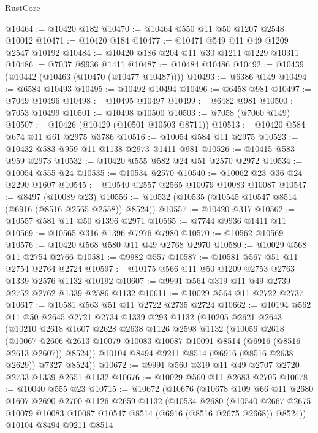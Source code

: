 \begin{lexlean}{RustCore}
\begin{coremodule}
@10464 := @10420 @182
@10470 := @10464 @550 @11 @50 @1207 @2548 @10012
@10471 := @10420 @184
@10477 := @10471 @549 @11 @49 @1209 @2547 @10192
@10484 := @10420 @186 @204 @11 @30 @1211 @1229 @10311
@10486 := @7037 @9936 @1411
@10487 := @10484 @10486
@10492 := @10439 (@10442 (@10463 (@10470 (@10477 @10487))))
@10493 := @6386 @149
@10494 := @6584 @10493
@10495 := @10492 @10494
@10496 := @6458 @981
@10497 := @7049 @10496
@10498 := @10495 @10497
@10499 := @6482 @981
@10500 := @7053 @10499
@10501 := @10498 @10500
@10503 := @7058 (@7060 @149)
@10507 := @10426 (@10429 (@10501 @10503 @8711))
@10513 := @10420 @584 @674 @11 @61 @2975 @3786
@10516 := @10054 @584 @11 @2975
@10523 := @10432 @583 @959 @11 @1138 @2973 @1411 @981
@10526 := @10415 @583 @959 @2973
@10532 := @10420 @555 @582 @24 @51 @2570 @2972
@10534 := @10054 @555 @24
@10535 := @10534 @2570
@10540 := @10062 @23 @36 @24 @2290 @1607
@10545 := @10540 @2557 @2565 @10079 @10083 @10087
@10547 := @8497 (@10089 @23)
@10556 := @10532 (@10535 (@10545 @10547 @8514 (@6916 (@8516 @2565 @2558)) @8524))
@10557 := @10420 @317
@10562 := @10557 @581 @11 @50 @1396 @2971
@10565 := @7744 @9936 @1411 @11
@10569 := @10565 @316 @1396 @7976 @7980
@10570 := @10562 @10569
@10576 := @10420 @568 @580 @11 @49 @2768 @2970
@10580 := @10029 @568 @11 @2754 @2766
@10581 := @9982 @557
@10587 := @10581 @567 @51 @11 @2754 @2764 @2724
@10597 := @10175 @566 @11 @50 @1209 @2753 @2763 @1339 @2576 @1132 @10192
@10607 := @9991 @564 @319 @11 @49 @2739 @2752 @2762 @1339 @2586 @1132
@10611 := @10029 @564 @11 @2722 @2737
@10617 := @10581 @563 @51 @11 @2722 @2735 @2724
@10662 := @10194
    @562
    @11
    @50
    @2645
    @2721
    @2734
    @1339
    @293
    @1132
    (@10205
      @2621
      @2643
      (@10210
        @2618
        @1607
        @2628
        @2638
        @1126
        @2598
        @1132
        (@10056
          @2618
          (@10067 @2606 @2613 @10079 @10083 @10087 @10091 @8514 (@6916 (@8516 @2613 @2607)) @8524))
        @10104
        @8494
        @9211
        @8514
        (@6916 (@8516 @2638 @2629))
        @7327
        @8524))
@10672 := @9991 @560 @319 @11 @49 @2707 @2720 @2733 @1339 @2651 @1132
@10676 := @10029 @560 @11 @2683 @2705
@10678 := @10040 @555 @23
@10715 := @10672
    (@10676
      (@10678
        @109
        @66
        @11
        @2680
        @1607
        @2690
        @2700
        @1126
        @2659
        @1132
        (@10534
          @2680
          (@10540 @2667 @2675 @10079 @10083 @10087 @10547 @8514 (@6916 (@8516 @2675 @2668)) @8524))
        @10104
        @8494
        @9211
        @8514

\end{coremodule}
\end{lexlean}
